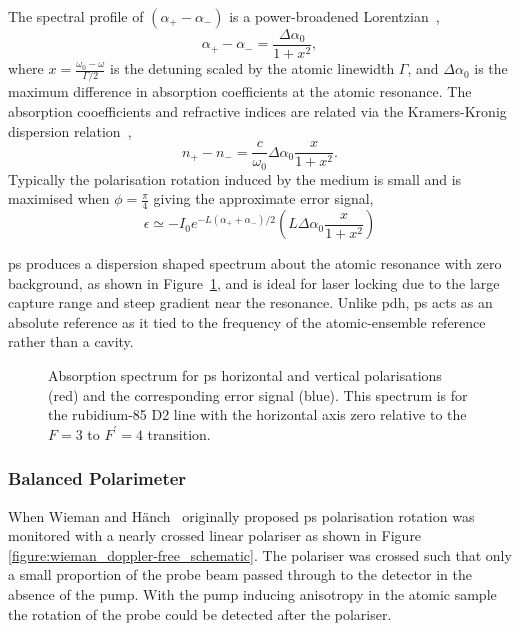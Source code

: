 The spectral profile of $(\alpha_+-\alpha_-)$ is a power-broadened Lorentzian~\cite{pearman_polarization_2002},
\begin{equation}
\alpha_+ - \alpha_- = \frac{\Delta\alpha_0}{1+x^2},
\end{equation}
where $x=\frac{\omega_0-\omega}{\Gamma/2}$ is the detuning scaled by the atomic linewidth $\Gamma$, and $\Delta\alpha_0$ is the maximum difference in absorption coefficients at the atomic resonance.
The absorption cooefficients and refractive indices are related via the Kramers-Kronig dispersion relation~\cite{demtroder_laser_2014},
\begin{equation}
n_+ - n_- = \frac{c}{\omega_0} \Delta\alpha_0 \frac{x}{1+x^2}.
\end{equation}
Typically the polarisation rotation induced by the medium is small and is maximised when $\phi=\frac{\pi}{4}$ giving the approximate error signal,
\begin{equation}
\epsilon \simeq - I_0 e^{-L(\alpha_++\alpha_-)/2}\left( L \Delta\alpha_0 \frac{x}{1+x^2}\right)
\end{equation}

\Gls{ps} produces a dispersion shaped spectrum about the atomic resonance with zero background, as shown in Figure~\ref{figure:polspecspectrum}, and is ideal for laser locking due to the large capture range and steep gradient near the resonance.
Unlike \gls{pdh}, \gls{ps} acts as an absolute reference as it tied to the frequency of the atomic-ensemble reference rather than a cavity.

\begin{figure}
\center

\caption{Absorption spectrum for \gls{ps} horizontal and vertical polarisations (red) and the corresponding error signal (blue). This spectrum is for the rubidium-85 D2 line with the horizontal axis zero relative to the $F=3$ to $F^\prime=4$ transition.}
\label{figure:polspecspectrum}
\end{figure}

\subsubsection{Balanced Polarimeter}

When Wieman and H\"anch~\cite{wieman_doppler-free_1976} originally proposed \gls{ps} polarisation rotation was monitored with a nearly crossed linear polariser as shown in Figure \ref{figure:wieman_doppler-free_schematic}.
The polariser was crossed such that only a small proportion of the probe beam passed through to the detector in the absence of the pump.
With the pump inducing anisotropy in the atomic sample the rotation of the probe could be detected after the polariser.

